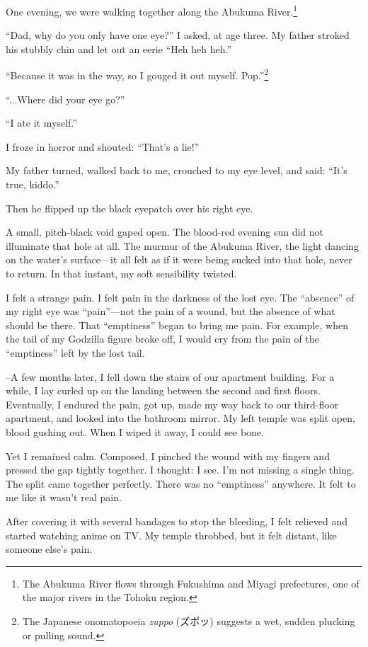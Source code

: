 \documentclass[
    a4paper,
    12pt,
    twoside,
    openany,
    UTF8,
    fontset=windows
]{ctexbook}
\begin{document}
One evening, we were walking together along the Abukuma River.\footnote{The Abukuma River flows through Fukushima and Miyagi prefectures, one of the major rivers in the Tohoku region.}

``Dad, why do you only have one eye?'' I asked, at age three. My father stroked his stubbly chin and let out an eerie ``Heh heh heh.''

``Because it was in the way, so I gouged it out myself. Pop.''\footnote{The Japanese onomatopoeia \textit{zuppo} (ズポッ) suggests a wet, sudden plucking or pulling sound.}

``...Where did your eye go?''

``I ate it myself.''

I froze in horror and shouted: ``That's a lie!''

My father turned, walked back to me, crouched to my eye level, and said: ``It's true, kiddo.''

Then he flipped up the black eyepatch over his right eye.

A small, pitch-black void gaped open. The blood-red evening sun did not illuminate that hole at all. The murmur of the Abukuma River, the light dancing on the water's surface---it all felt as if it were being sucked into that hole, never to return. In that instant, my soft sensibility twisted.

I felt a strange pain. I felt pain in the darkness of the lost eye. The ``absence'' of my right eye was ``pain''---not the pain of a wound, but the absence of what should be there. That ``emptiness'' began to bring me pain. For example, when the tail of my Godzilla figure broke off, I would cry from the pain of the ``emptiness'' left by the lost tail.

\---A few months later, I fell down the stairs of our apartment building. For a while, I lay curled up on the landing between the second and first floors. Eventually, I endured the pain, got up, made my way back to our third-floor apartment, and looked into the bathroom mirror. My left temple was split open, blood gushing out. When I wiped it away, I could see bone.

Yet I remained calm. Composed, I pinched the wound with my fingers and pressed the gap tightly together. I thought: I see. I'm not missing a single thing. The split came together perfectly. There was no ``emptiness'' anywhere. It felt to me like it wasn't real pain.

After covering it with several bandages to stop the bleeding, I felt relieved and started watching anime on TV. My temple throbbed, but it felt distant, like someone else's pain.
\end{document}
